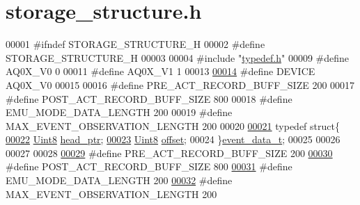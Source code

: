 \hypertarget{a00003_source}{\section{storage\+\_\+structure.\+h}
\label{a00003_source}
}

\begin{DoxyCode}
00001 \textcolor{preprocessor}{#ifndef STORAGE\_STRUCTURE\_H}
00002 \textcolor{preprocessor}{#define STORAGE\_STRUCTURE\_H}
00003 
00004 \textcolor{preprocessor}{#include "\hyperlink{a00001}{typedef.h}"}
00009 \textcolor{preprocessor}{#define  AQ0X\_V0      0}
00011 \textcolor{preprocessor}{#define  AQ0X\_V1      1}
00013 
\hypertarget{a00003_source_l00014}{}\hyperlink{a00003_a775d096fbc3988fb7ed858b79ef44e22}{00014} \textcolor{preprocessor}{#define  DEVICE      AQ0X\_V0}
00015 
00016 \textcolor{preprocessor}{#define PRE\_ACT\_RECORD\_BUFF\_SIZE                                200}
00017 \textcolor{preprocessor}{#define POST\_ACT\_RECORD\_BUFF\_SIZE                               800}
00018 \textcolor{preprocessor}{#define EMU\_MODE\_DATA\_LENGTH                                    200}
00019 \textcolor{preprocessor}{#define MAX\_EVENT\_OBSERVATION\_LENGTH                            200}
00020 
\hypertarget{a00003_source_l00021}{}\hyperlink{a00003}{00021} \textcolor{keyword}{typedef} \textcolor{keyword}{struct}\{
\hypertarget{a00003_source_l00022}{}\hyperlink{a00003_abcdcf9a1889bf0892658828ceac54668}{00022}         \hyperlink{a00001_a979e3e23b9a449e69ab6a8a83b6042f8}{Uint8}                     \hyperlink{a00003_abcdcf9a1889bf0892658828ceac54668}{head\_ptr};
\hypertarget{a00003_source_l00023}{}\hyperlink{a00003_a90588fed720ad404c18bcbb8fa84878e}{00023}         \hyperlink{a00001_a979e3e23b9a449e69ab6a8a83b6042f8}{Uint8}                     \hyperlink{a00003_a90588fed720ad404c18bcbb8fa84878e}{offset};
00024 \}\hyperlink{a00003_d0/d89/a00071}{event\_data\_t};
00025 
00026 
00027 
00028 
\hypertarget{a00003_source_l00029}{}\hyperlink{a00003_a18dcecc16ded13fa622e0913e73442e6}{00029} \textcolor{preprocessor}{#define PRE\_ACT\_RECORD\_BUFF\_SIZE                                200}
\hypertarget{a00003_source_l00030}{}\hyperlink{a00003_ab1ad440de86fff80e517ad748de2ee39}{00030} \textcolor{preprocessor}{#define POST\_ACT\_RECORD\_BUFF\_SIZE                               800}
\hypertarget{a00003_source_l00031}{}\hyperlink{a00003_af4c3a8ad94feb4d7bda7f107f34baf41}{00031} \textcolor{preprocessor}{#define EMU\_MODE\_DATA\_LENGTH                                    200}
\hypertarget{a00003_source_l00032}{}\hyperlink{a00003_aa060aeb1ecb530b3c6f6d91060999b70}{00032} \textcolor{preprocessor}{#define MAX\_EVENT\_OBSERVATION\_LENGTH                            200}

\end{DoxyCode}
